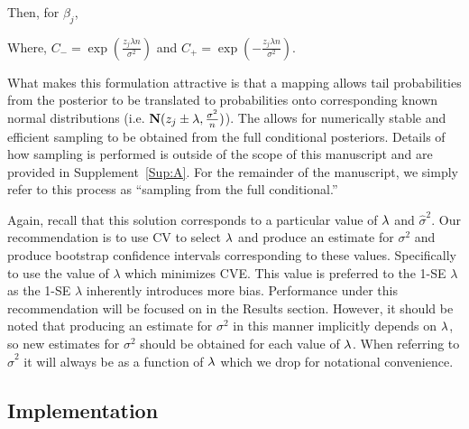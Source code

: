 Then, for $\beta_j$,


Where, $C_{-} = \exp(\frac{z_j \lambda n}{\sigma^2})$ and $C_{+} = \exp(-\frac{z_j \lambda n}{\sigma^2})$.

What makes this formulation attractive is that a mapping allows tail probabilities from the posterior to be translated to probabilities onto corresponding known normal distributions (i.e. $\mathbf{N}(z_j \pm \lambda, \frac{\sigma^2}{n})$). The allows for numerically stable and efficient sampling to be obtained from the full conditional posteriors. Details of how sampling is performed is outside of the scope of this manuscript and are provided in Supplement~\ref{Sup:A}. For the remainder of the manuscript, we simply refer to this process as ``sampling from the full conditional.''

Again, recall that this solution corresponds to a particular value of $\lambda$ and $\hat{\sigma}^2$. Our recommendation is to use CV to select $\lambda$ and produce an estimate for $\sigma^2$ and produce bootstrap confidence intervals corresponding to these values. Specifically to use the value of $\lambda$ which minimizes CVE. This value is preferred to the 1-SE $\lambda$ as the 1-SE $\lambda$ inherently introduces more bias. Performance under this recommendation will be focused on in the Results section. However, it should be noted that producing an estimate for $\sigma^2$ in this manner implicitly depends on $\lambda$, so new estimates for $\sigma^2$ should be obtained for each value of $\lambda$. When referring to $\hat{\sigma}^2$ it will always be as a function of $\lambda$ which we drop for notational convenience.

\subsection{Implementation}
\label{Sec:implementation}

